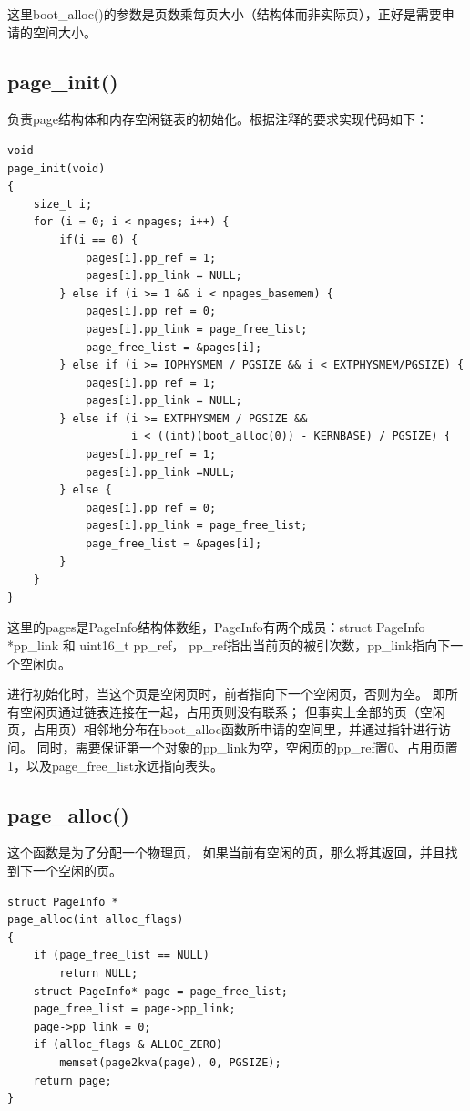 \documentclass[12pt,a4paper,UTF8]{article}
\begin{document}
    这里boot\_alloc()的参数是页数乘每页大小（结构体而非实际页），正好是需要申请的空间大小。

    \subsection{page\_init()}
    负责page结构体和内存空闲链表的初始化。根据注释的要求实现代码如下：

    \begin{lstlisting}[style=CPP]
void
page_init(void)
{
	size_t i;
	for (i = 0; i < npages; i++) {
		if(i == 0) {	
            pages[i].pp_ref = 1;
			pages[i].pp_link = NULL;
		} else if (i >= 1 && i < npages_basemem) {
			pages[i].pp_ref = 0;
			pages[i].pp_link = page_free_list; 
			page_free_list = &pages[i];
		} else if (i >= IOPHYSMEM / PGSIZE && i < EXTPHYSMEM/PGSIZE) {
			pages[i].pp_ref = 1;
			pages[i].pp_link = NULL;
        } else if (i >= EXTPHYSMEM / PGSIZE && 
                   i < ((int)(boot_alloc(0)) - KERNBASE) / PGSIZE) {
			pages[i].pp_ref = 1;
			pages[i].pp_link =NULL;
		} else {
			pages[i].pp_ref = 0;
			pages[i].pp_link = page_free_list;
			page_free_list = &pages[i];
		}
	}
}
    \end{lstlisting}

    这里的pages是PageInfo结构体数组，PageInfo有两个成员：struct PageInfo *pp\_link 和 uint16\_t pp\_ref，
    pp\_ref指出当前页的被引次数，pp\_link指向下一个空闲页。


    进行初始化时，当这个页是空闲页时，前者指向下一个空闲页，否则为空。
    即所有空闲页通过链表连接在一起，占用页则没有联系；
    但事实上全部的页（空闲页，占用页）相邻地分布在boot\_alloc函数所申请的空间里，并通过指针进行访问。
    同时，需要保证第一个对象的pp\_link为空，空闲页的pp\_ref置0、占用页置1，以及page\_free\_list永远指向表头。

    \subsection{page\_alloc()}

    这个函数是为了分配一个物理页，
    如果当前有空闲的页，那么将其返回，并且找到下一个空闲的页。

    \begin{lstlisting}[style=CPP]
struct PageInfo *
page_alloc(int alloc_flags)
{	
    if (page_free_list == NULL)
		return NULL;
	struct PageInfo* page = page_free_list;
	page_free_list = page->pp_link;
	page->pp_link = 0;
	if (alloc_flags & ALLOC_ZERO)
		memset(page2kva(page), 0, PGSIZE);
	return page;
}
    \end{lstlisting}
\end{document}
